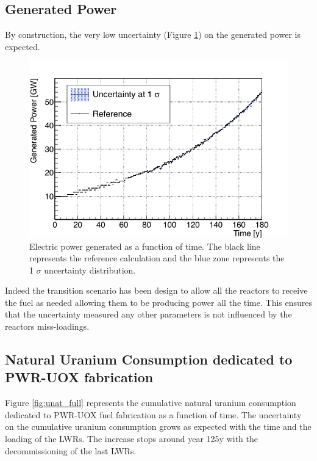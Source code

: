 \documentclass{anstrans}
\begin{document}
\subsection{Generated Power}
By construction, the very low uncertainty (Figure \ref{fig:power_full}) on the
generated power is expected.

\begin{figure}[h!] %
    \centering
    \includegraphics[scale=0.35]{power_full}
    \caption{Electric power generated as a function of time.  The black line
        represents the reference calculation and the blue zone
        represents the 1 $\sigma$ uncertainty distribution.}\label{fig:power_full}
\end{figure}

Indeed the transition scenario has been design to allow all the reactors to
receive the fuel as needed allowing them to be producing power all the time.
This ensures that the uncertainty measured any other parameters is not
influenced by the reactors miss-loadings.


\subsection{Natural Uranium Consumption dedicated to PWR-UOX fabrication}

Figure \ref{fig:unat_full} represents the cumulative natural uranium consumption
dedicated to PWR-UOX fuel fabrication as a function of time.  The uncertainty on
the cumulative uranium consumption grows as expected with the time and the
loading of the \glspl{LWR}.  The increase stops around year 125y with the
decommissioning of the last \glspl{LWR}.
\end{document}
